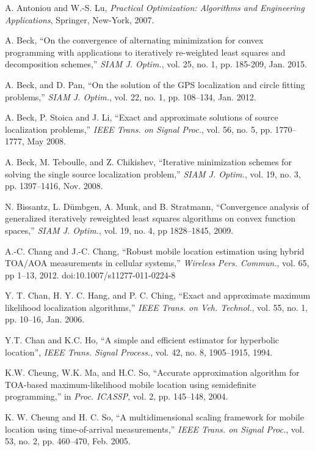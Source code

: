 \begin{thebibliography}{99}

A. Antoniou and W.-S. Lu, {\em Practical Optimization: Algorithms and Engineering Applications}, Springer, New-York, 2007.

A. Beck, ``On the convergence of alternating minimization for convex programming with applications to iteratively re-weighted least squares and decomposition schemes,''  {\em SIAM J. Optim.}, vol. 25, no. 1, pp. 185-209, Jan. 2015.

A. Beck, and D. Pan, ``On the solution of the GPS localization and circle fitting problems,''  {\em SIAM J. Optim.}, vol. 22, no. 1, pp. 108--134, Jan. 2012.

A. Beck, P. Stoica and J. Li,  ``Exact and approximate solutions of source localization problems,'' {\em IEEE Trans. on Signal Proc.}, vol. 56, no. 5, pp. 1770--1777, May 2008.

A. Beck, M. Teboulle, and Z. Chikishev, ``Iterative minimization schemes for solving the single source localization problem,''  {\em SIAM J. Optim.}, vol. 19, no. 3, pp. 1397--1416, Nov. 2008.

N. Bissantz, L. D\"umbgen, A. Munk, and B.  Stratmann, ``Convergence analysis of generalized iteratively reweighted least squares algorithms on convex function spaces,'' {\em SIAM J. Optim.}, vol. 19, no. 4, pp 1828--1845, 2009.

A.-C. Chang and J.-C. Chang, ``Robust mobile location estimation using hybrid
TOA/AOA measurements in cellular systems,'' {\em Wireless Pers. Commun.}, vol. 65, pp 1--13, 2012. doi:10.1007/s11277-011-0224-8

 \label{r17}
Y. T. Chan, H. Y. C. Hang, and P. C. Ching, ``Exact and approximate maximum likelihood localization algorithms,'' {\em IEEE Trans. on Veh. Technol.}, vol. 55, no. 1, pp. 10--16, Jan. 2006.

Y.T. Chan and K.C. Ho, ``A simple and efficient estimator for hyperbolic location'', {\em IEEE Trans. Signal
Process.}, vol. 42, no. 8, 1905--1915, 1994.

 \label{r7}
K.W. Cheung, W.K. Ma, and H.C. So, ``Accurate approximation algorithm for TOA-based maximum-likelihood mobile location using semidefinite programming,'' in {\em Proc. ICASSP}, vol. 2, pp. 145--148, 2004.

 \label{r8}
K. W. Cheung and H. C. So, ``A multidimensional scaling framework for mobile location using time-of-arrival measurements,'' {\em IEEE Trans. on Signal Proc.}, vol. 53, no. 2, pp. 460--470, Feb. 2005.


\end{thebibliography}
